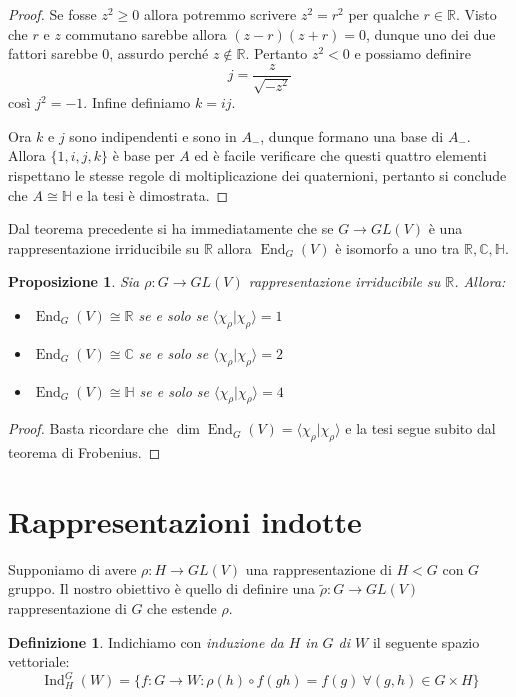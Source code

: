 \documentclass[11pt]{article}
\theoremstyle{plain}
\newtheorem{prop}[thm]{Proposizione}
\theoremstyle{definition}
\newtheorem{defn}{Definizione}[section]
\theoremstyle{remark}
\newcommand{\C}{\mathbb{C}}
\newcommand{\R}{\mathbb{R}}
\newcommand{\HH}{\mathbb{H}}
\DeclareMathOperator{\End}{End}
\DeclareMathOperator{\Ind}{Ind}
\begin{document}
\begin{proof}
Se fosse $z^2 \ge 0$ allora potremmo scrivere $z^2=r^2$ per qualche $r\in\R$.
Visto che $r$ e $z$ commutano sarebbe allora $(z-r)(z+r)=0$, dunque uno dei due fattori sarebbe $0$, assurdo perché $z\not\in\R$. Pertanto $z^2 < 0$ e possiamo definire
\[j = \frac{z}{\sqrt{-z^2}}\]
così $j^2 = -1$. Infine definiamo $k = ij$.

Ora $k$ e $j$ sono indipendenti e sono in $A_-$, dunque formano una base di $A_-$. Allora $\{1,i,j,k\}$ è base per $A$ ed è facile
verificare che questi quattro elementi rispettano le stesse regole di moltiplicazione dei quaternioni, pertanto si conclude che $A\cong\HH$ e la tesi è dimostrata.


\end{proof}




Dal teorema precedente si ha immediatamente che se $G\to GL(V)$ è una rappresentazione irriducibile su $\R$ allora $\End_G(V)$ è isomorfo a uno
tra $\R, \C, \HH$.

\begin{prop}
Sia $\rho:G\to GL(V)$ rappresentazione irriducibile su $\R$. Allora:
\begin{itemize}
\item $\End_G(V) \cong \R$ se e solo se $\langle\chi_\rho|\chi_\rho\rangle = 1$
\item $\End_G(V) \cong \C$ se e solo se $\langle\chi_\rho|\chi_\rho\rangle = 2$
\item $\End_G(V) \cong \HH$ se e solo se $\langle\chi_\rho|\chi_\rho\rangle = 4$
\end{itemize}
\end{prop}
\begin{proof}
Basta ricordare che $\dim \End_G(V) = \langle\chi_\rho|\chi_\rho\rangle$ e la tesi segue subito
dal teorema di Frobenius.
\end{proof}










\newpage
\section{Rappresentazioni indotte}
Supponiamo di avere $\rho:H\rightarrow GL(V)$ una rappresentazione di $H<G$ con $G$ gruppo. Il nostro obiettivo è quello di definire una $\widetilde{\rho}:G\rightarrow GL(V)$ rappresentazione di $G$ che estende $\rho$.

\begin{defn}Indichiamo con \emph{induzione da $H$ in $G$ di $W$} il seguente spazio vettoriale:
\[\Ind_H^G(W)=\{f:G\rightarrow W: \rho(h)\circ f(gh)=f(g)\ \forall (g,h)\in G\times H\}   \]
\end{defn}
\end{document}

